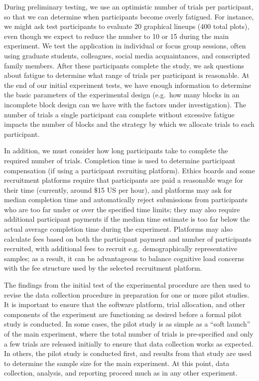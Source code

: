 \documentclass[
  10pt,
  letterpaper,
  DIV=11,
  numbers=noendperiod]{scrartcl}
\begin{document}
During preliminary testing, we use an optimistic number of trials per
participant, so that we can determine when participants become overly
fatigued. For instance, we might ask test participants to evaluate 20
graphical lineups (400 total plots), even though we expect to reduce the
number to 10 or 15 during the main experiment. We test the application
in individual or focus group sessions, often using graduate students,
colleagues, social media acquaintances, and conscripted family members.
After these participants complete the study, we ask questions about
fatigue to determine what range of trials per participant is reasonable.
At the end of our initial experiment tests, we have enough information
to determine the basic parameters of the experimental design (e.g.~how
many blocks in an incomplete block design can we have with the factors
under investigation). The number of trials a single participant can
complete without excessive fatigue impacts the number of blocks and the
strategy by which we allocate trials to each participant.

In addition, we must consider how long participants take to complete the
required number of trials. Completion time is used to determine
participant compensation (if using a participant recruiting platform).
Ethics boards and some recruitment platforms require that participants
are paid a reasonable wage for their time (currently, around \$15 US per
hour), and platforms may ask for median completion time and
automatically reject submissions from participants who are too far under
or over the specified time limits; they may also require additional
participant payments if the median time estimate is too far below the
actual average completion time during the experiment. Platforms may also
calculate fees based on both the participant payment and number of
participants recruited, with additional fees to recruit
e.g.~demographically representative samples; as a result, it can be
advantageous to balance cognitive load concerns with the fee structure
used by the selected recruitment platform.

The findings from the initial test of the experimental procedure are
then used to revise the data collection procedure in preparation for one
or more pilot studies. It is important to ensure that the software
platform, trial allocation, and other components of the experiment are
functioning as desired before a formal pilot study is conducted. In some
cases, the pilot study is as simple as a ``soft launch'' of the main
experiment, where the total number of trials is pre-specified and only a
few trials are released initially to ensure that data collection works
as expected. In others, the pilot study is conducted first, and results
from that study are used to determine the sample size for the main
experiment. At this point, data collection, analysis, and reporting
proceed much as in any other experiment.
\end{document}
